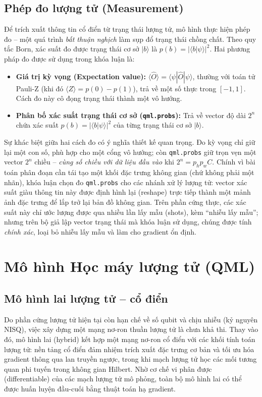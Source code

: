 \subsection{Phép đo lượng tử (Measurement)}
Để trích xuất thông tin cổ điển từ trạng thái lượng tử, mô hình thực hiện phép đo -- một quá trình \emph{bất thuận nghịch} làm sụp đổ trạng thái chồng chất. Theo quy tắc Born, xác suất đo được trạng thái cơ sở $|b\rangle$ là $p(b)=|\langle b|\psi\rangle|^2$. Hai phương pháp đo được sử dụng trong khóa luận là:
\begin{itemize}
    \item \textbf{Giá trị kỳ vọng (Expectation value):} $\langle \hat{O} \rangle = \langle \psi | \hat{O} | \psi \rangle$, thường với toán tử Pauli-Z (khi đó $\langle Z\rangle = p(0)-p(1)$), trả về một số thực trong $[-1,1]$. Cách đo này cô đọng trạng thái thành một vô hướng.
    \item \textbf{Phân bố xác suất trạng thái cơ sở (\texttt{qml.probs}):} Trả về vector độ dài $2^n$ chứa xác suất $p(b)=|\langle b | \psi \rangle|^2$ của từng trạng thái cơ sở $|b\rangle$.
\end{itemize}
Sự khác biệt giữa hai cách đo có ý nghĩa thiết kế quan trọng. Đo kỳ vọng chỉ giữ lại một con số, phù hợp cho một cổng vô hướng; còn \texttt{qml.probs} giữ trọn vẹn một vector $2^n$ chiều -- \emph{cùng số chiều với dữ liệu đầu vào} khi $2^n = p_h p_w C$. Chính vì bài toán phân đoạn cần tái tạo một khối đặc trưng không gian (chứ không phải một nhãn), khóa luận chọn đo \texttt{qml.probs} cho các nhánh xử lý lượng tử: vector xác suất giàu thông tin này được định hình lại (reshape) trực tiếp thành một mảnh ảnh đặc trưng để lắp trở lại bản đồ không gian. Trên phần cứng thực, các xác suất này chỉ ước lượng được qua nhiều lần lấy mẫu (shots), kèm ``nhiễu lấy mẫu''; nhưng trên bộ giả lập vector trạng thái mà khóa luận sử dụng, chúng được tính \emph{chính xác}, loại bỏ nhiễu lấy mẫu và làm cho gradient ổn định.

\FloatBarrier

\section{Mô hình Học máy lượng tử (QML)}
\subsection{Mô hình lai lượng tử -- cổ điển}
Do phần cứng lượng tử hiện tại còn hạn chế về số qubit và chịu nhiễu (kỷ nguyên NISQ), việc xây dựng một mạng nơ-ron thuần lượng tử là chưa khả thi. Thay vào đó, mô hình lai (hybrid) kết hợp một mạng nơ-ron cổ điển với các khối tính toán lượng tử: nền tảng cổ điển đảm nhiệm trích xuất đặc trưng cơ bản và tối ưu hóa gradient thông qua lan truyền ngược, trong khi mạch lượng tử học các mối tương quan phi tuyến trong không gian Hilbert. Nhờ cơ chế vi phân được (differentiable) của các mạch lượng tử mô phỏng, toàn bộ mô hình lai có thể được huấn luyện đầu-cuối bằng thuật toán hạ gradient.
